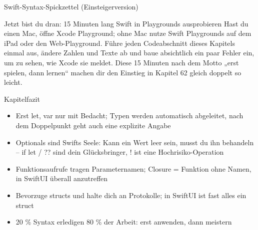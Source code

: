 \begin{center}\small\color{gray}Swift-Syntax-Spickzettel (Einsteigerversion)\end{center}

\begin{tcbpractice}{Jetzt bist du dran: 15 Minuten lang Swift in Playgrounds ausprobieren}
Hast du einen Mac, öffne Xcode Playground; ohne Mac nutze Swift Playgrounds auf dem iPad oder den Web-Playground. Führe jeden Codeabschnitt dieses Kapitels einmal aus, ändere Zahlen und Texte ab und baue absichtlich ein paar Fehler ein, um zu sehen, wie Xcode sie meldet. Diese 15 Minuten nach dem Motto „erst spielen, dann lernen“ machen dir den Einstieg in Kapitel 62 gleich doppelt so leicht.

\end{tcbpractice}

\begin{tcbsummary}{Kapitelfazit}
\begin{itemize}
  \item Erst let, var nur mit Bedacht; Typen werden automatisch abgeleitet, nach dem Doppelpunkt geht auch eine explizite Angabe
  \item Optionals sind Swifts Seele: Kann ein Wert leer sein, musst du ihn behandeln – if let / ?? sind dein Glücksbringer, ! ist eine Hochrisiko-Operation
  \item Funktionsaufrufe tragen Parameternamen; Closure = Funktion ohne Namen, in SwiftUI überall anzutreffen
  \item Bevorzuge structs und halte dich an Protokolle; in SwiftUI ist fast alles ein struct
  \item 20 \% Syntax erledigen 80 \% der Arbeit: erst anwenden, dann meistern
\end{itemize}

\end{tcbsummary}
